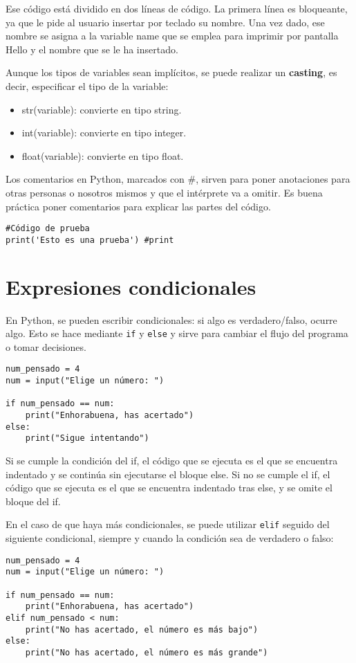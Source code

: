 Ese código está dividido en dos líneas de código. La primera línea es bloqueante, ya que le pide al usuario insertar por teclado su nombre. Una vez dado, ese nombre se asigna a la variable name que se emplea para imprimir por pantalla Hello y el nombre que se le ha insertado. 

Aunque los tipos de variables sean implícitos, se puede realizar un \textbf{casting}, es decir, especificar el tipo de la variable:
\begin{itemize}
\item str(variable): convierte en tipo string.
\item int(variable): convierte en tipo integer.
\item float(variable): convierte en tipo float.
\end{itemize}

Los comentarios en Python, marcados con \#, sirven para poner anotaciones para otras personas o nosotros mismos y que el intérprete va a omitir. Es buena práctica poner comentarios para explicar las partes del código.
\begin{lstlisting}
#Código de prueba
print('Esto es una prueba') #print
\end{lstlisting}

\section{Expresiones condicionales}
En Python, se pueden escribir condicionales: si algo es verdadero/falso, ocurre algo. Esto se hace mediante \texttt{if} y \texttt{else} y sirve para cambiar el flujo del programa o tomar decisiones.
\begin{lstlisting}
num_pensado = 4
num = input("Elige un número: ")

if num_pensado == num:
	print("Enhorabuena, has acertado")
else:
	print("Sigue intentando")
\end{lstlisting}

Si se cumple la condición del if, el código que se ejecuta es el que se encuentra indentado y se continúa sin ejecutarse el bloque else. Si no se cumple el if, el código que se ejecuta es el que se encuentra indentado tras else, y se omite el bloque del if. 

En el caso de que haya más condicionales, se puede utilizar \texttt{elif} seguido del siguiente condicional, siempre y cuando la condición sea de verdadero o falso:
\begin{lstlisting}
num_pensado = 4
num = input("Elige un número: ")

if num_pensado == num:
	print("Enhorabuena, has acertado")
elif num_pensado < num:
	print("No has acertado, el número es más bajo")
else:
	print("No has acertado, el número es más grande")
\end{lstlisting}

